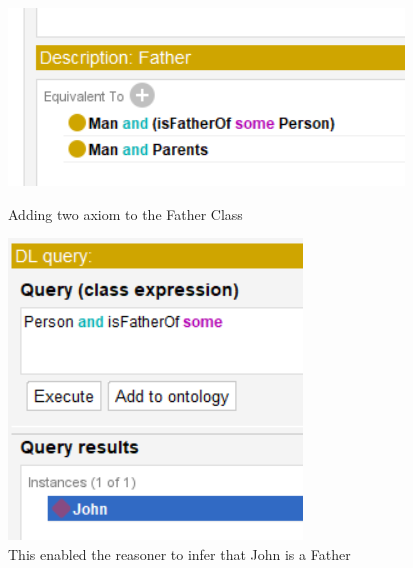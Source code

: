 \begin{figure}[H]
    \begin{minipage}[b]{0.4\textwidth}
        \centering
        \includegraphics[width=\textwidth]{images/1.1 - tuto/q4 - adding an axiom to father .png}
        \caption{Adding two axiom to the Father Class}
        \label{fig:image4}
    \end{minipage}
    \hfill
    \begin{minipage}[b]{0.25\textwidth}
        \centering
        \includegraphics[width=\textwidth]{images/1.1 - tuto/q5 - now q3 works .png}
        \caption{This enabled the reasoner to infer that John is a Father}
        \label{fig:image5}
    \end{minipage}
    \label{fig:allimages}
\end{figure}